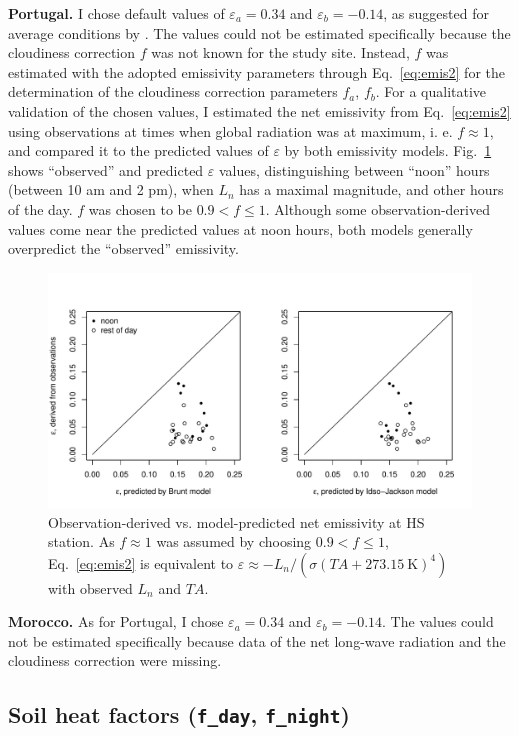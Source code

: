 \documentclass{scrreprt}
\begin{document}
\textbf{Portugal.}
I chose default values of $\varepsilon_a = 0.34$ and $\varepsilon_b = -0.14$, as suggested for average conditions by \citet{maidment93}.
The values could not be estimated specifically because the cloudiness correction $f$ was not known for the study site.
Instead, $f$ was estimated with the adopted emissivity parameters through Eq.~\eqref{eq:emis2} for the determination of the cloudiness correction parameters $f_a$, $f_b$.
For a qualitative validation of the chosen values, I estimated the net emissivity from Eq.~\eqref{eq:emis2} using observations at times when global radiation was at maximum, i. e. $f \approx 1$, and compared it to the predicted values of $\varepsilon$ by both emissivity models.
Fig.~\ref{fig:portugal_emis_both} shows ``observed'' and predicted $\varepsilon$ values, distinguishing between ``noon'' hours (between 10 am and 2 pm), when $L_n$ has a maximal magnitude, and other hours of the day.
$f$ was chosen to be $0.9 < f \leq 1$.
Although some observation-derived values come near the predicted values at noon hours, both models generally overpredict the ``observed'' emissivity.

\begin{figure}[ht]
  \centering
  \includegraphics[width=0.8\hsize]{./plot_emis_both_HS.pdf}
  \caption{Observation-derived vs. model-predicted net emissivity at HS station.
           As $f \approx 1$ was assumed by choosing $0.9 < f \leq 1$, Eq.~\eqref{eq:emis2} is equivalent to $\varepsilon \approx - L_n / (\sigma (TA + 273.15~\text{K})^4)$ with observed $L_n$ and $TA$.}
  \label{fig:portugal_emis_both}
\end{figure}

\textbf{Morocco.}
As for Portugal, I chose $\varepsilon_a = 0.34$ and $\varepsilon_b = -0.14$.
The values could not be estimated specifically because data of the net long-wave radiation and the cloudiness correction were missing.

\subsection{Soil heat factors (\texttt{f\_day}, \texttt{f\_night})} \label{ssec:parest_rad_f}
\end{document}
